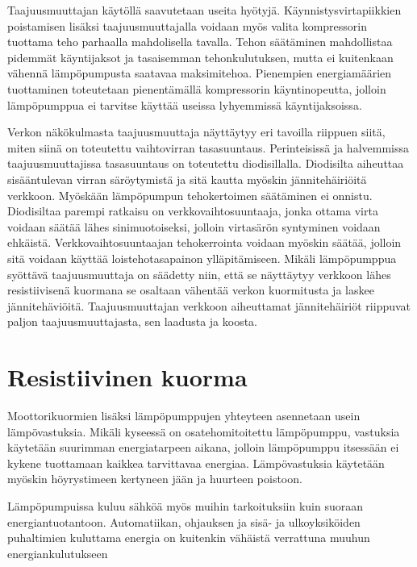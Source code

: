   Taajuusmuuttajan käytöllä saavutetaan useita hyötyjä. Käynnistysvirtapiikkien poistamisen lisäksi taajuusmuuttajalla voidaan myös valita kompressorin tuottama teho parhaalla mahdolisella tavalla. Tehon säätäminen mahdollistaa pidemmät käyntijaksot ja tasaisemman tehonkulutuksen, mutta ei kuitenkaan vähennä lämpöpumpusta saatavaa maksimitehoa. Pienempien energiamäärien tuottaminen toteutetaan pienentämällä kompressorin käyntinopeutta, jolloin lämpöpumppua ei tarvitse käyttää useissa lyhyemmissä käyntijaksoissa.

  Verkon näkökulmasta taajuusmuuttaja näyttäytyy eri tavoilla riippuen siitä, miten siinä on toteutettu vaihtovirran tasasuuntaus. Perinteisissä ja halvemmissa taajuusmuuttajissa tasasuuntaus on toteutettu diodisillalla. Diodisilta aiheuttaa sisääntulevan virran säröytymistä ja sitä kautta myöskin jännitehäiriöitä verkkoon. Myöskään lämpöpumpun tehokertoimen säätäminen ei onnistu. Diodisiltaa parempi ratkaisu on verkkovaihtosuuntaaja, jonka ottama virta voidaan säätää lähes sinimuotoiseksi, jolloin virtasärön syntyminen voidaan ehkäistä. Verkkovaihtosuuntaajan tehokerrointa voidaan myöskin säätää, jolloin sitä voidaan käyttää loistehotasapainon ylläpitämiseen. Mikäli lämpöpumppua syöttävä taajuusmuuttaja on säädetty niin, että se näyttäytyy verkkoon lähes resistiivisenä kuormana se osaltaan vähentää verkon kuormitusta ja laskee jännitehäviöitä. Taajuusmuuttajan verkkoon aiheuttamat jännitehäiriöt riippuvat paljon taajuusmuuttajasta, sen laadusta ja koosta. \parencite{koskenjoki}

\section{Resistiivinen kuorma}
  Moottorikuormien lisäksi lämpöpumppujen yhteyteen asennetaan usein lämpövastuksia. Mikäli kyseessä on osatehomitoitettu lämpöpumppu, vastuksia käytetään suurimman energiatarpeen aikana, jolloin lämpöpumppu itsessään ei kykene tuottamaan kaikkea tarvittavaa energiaa. Lämpövastuksia käytetään myöskin höyrystimeen kertyneen jään ja huurteen poistoon.

  Lämpöpumpuissa kuluu sähköä myös muihin tarkoituksiin kuin suoraan energiantuotantoon. Automatiikan, ohjauksen ja sisä- ja ulkoyksiköiden puhaltimien kuluttama energia on kuitenkin vähäistä verrattuna muuhun energiankulutukseen
